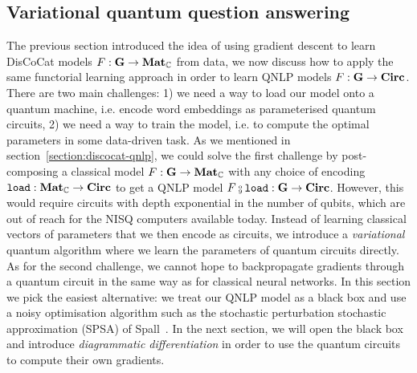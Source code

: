 
\subsection{Variational quantum question answering}\label{subsection:vqqa}

The previous section introduced the idea of using gradient descent to learn DisCoCat models $F : \mathbf{G} \to \mathbf{Mat}_{\mathbb{C}}$ from data, we now discuss how to apply the same functorial learning approach in order to learn QNLP models $F : \mathbf{G} \to \mathbf{Circ}$.
There are two main challenges: 1) we need a way to load our model onto a quantum machine, i.e. encode word embeddings as parameterised quantum circuits, 2) we need a way to train the model, i.e. to compute the optimal parameters in some data-driven task.
As we mentioned in section~\ref{section:discocat-qnlp}, we could solve the first challenge by post-composing a classical model $F : \mathbf{G} \to \mathbf{Mat}_{\mathbb{C}}$ with any choice of encoding $\mathtt{load} : \mathbf{Mat}_{\mathbb{C}} \to \mathbf{Circ}$ to get a QNLP model $F \fcmp \mathtt{load} : \G \to \mathbf{Circ}$.
However, this would require circuits with depth exponential in the number of qubits, which are out of reach for the NISQ computers available today.
Instead of learning classical vectors of parameters that we then encode as circuits, we introduce a \emph{variational} quantum algorithm where we learn the parameters of quantum circuits directly.
As for the second challenge, we cannot hope to backpropagate gradients through a quantum circuit in the same way as for classical neural networks.
In this section we pick the easiest alternative: we treat our QNLP model as a black box and use a noisy optimisation algorithm such as the stochastic perturbation stochastic approximation (SPSA) of Spall~\cite{Spall98}.
In the next section, we will open the black box and introduce \emph{diagrammatic differentiation} in order to use the quantum circuits to compute their own gradients.

